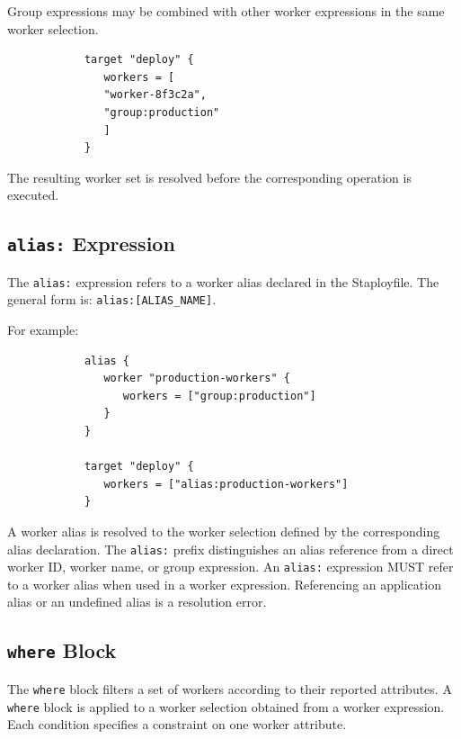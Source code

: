 \documentclass[11pt,a4paper]{article}
\begin{document}
    Group expressions may be combined with other worker expressions in the same worker selection.

    \begin{center}
        \begin{verbatim}
            target "deploy" {
               workers = [
               "worker-8f3c2a",
               "group:production"
               ]
            }
        \end{verbatim}
    \end{center}

    The resulting worker set is resolved before the corresponding operation is executed.

    \subsection{\texttt{alias:} Expression}\label{subsec:texttt-expression}

    The \texttt{alias:} expression refers to a worker alias declared in the Staployfile.
    The general form is: \texttt{alias:[ALIAS\_NAME]}.

    For example:

    \begin{center}
        \begin{verbatim}
            alias {
               worker "production-workers" {
                  workers = ["group:production"]
               }
            }

            target "deploy" {
               workers = ["alias:production-workers"]
            }
        \end{verbatim}
    \end{center}

    A worker alias is resolved to the worker selection defined by the corresponding alias declaration.
    The \texttt{alias:} prefix distinguishes an alias reference from a direct worker ID, worker name, or group expression.
    An \texttt{alias:} expression MUST refer to a worker alias when used in a worker expression.
    Referencing an application alias or an undefined alias is a resolution error.

    \subsection{\texttt{where} Block}\label{subsec:where-block}

    The \texttt{where} block filters a set of workers according to their reported attributes.
    A \texttt{where} block is applied to a worker selection obtained from a worker expression.
    Each condition specifies a constraint on one worker attribute.
\end{document}
